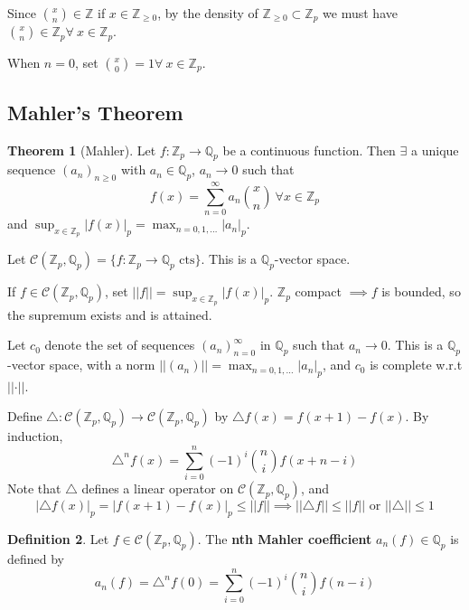 \documentclass[a4paper]{article}
\theoremstyle{definition}
\newtheorem{definition}{Definition}
\theoremstyle{default}
\newtheorem{theorem}[definition]{Theorem}
\theoremstyle{remark}
\newcommand*\abs[1]{\left|#1\right|}
\newcommand*\norm[1]{\abs{\abs{#1}}}
\begin{document}
Since ${x \choose n} \in \mathbb{Z}$ if $x \in \mathbb{Z}_{\geq 0}$,
by the density of $\mathbb{Z}_{\geq 0} \subset \mathbb{Z}_p$ we must have ${x \choose n} \in \mathbb{Z}_p \forall\ x \in \mathbb{Z}_p$.

When $n=0$,
set ${x \choose 0}=1 \forall\ x \in \mathbb{Z}_p$.

\subsection{Mahler's Theorem}
\begin{theorem}[Mahler]
	Let $f: \mathbb{Z}_p \to \mathbb{Q}_p$ be a continuous function.
	Then $\exists$ a unique sequence $(a_n)_{n\geq 0}$ with $a_n \in \mathbb{Q}_p$, $a_n \to 0$ such that
	$$f(x) = \sum_{n=0}^{\infty} a_n {x \choose n}\ \forall x \in \mathbb{Z}_p$$
	and $\sup_{x \in \mathbb{Z}_p}\abs{f(x)}_p = \max_{n=0,1,\dots}\abs{a_n}_p$.
\end{theorem}

Let $\mathcal{C}(\mathbb{Z}_p, \mathbb{Q}_p) = \{f: \mathbb{Z}_p \to \mathbb{Q}_p \text{ cts}\}$.
This is a $\mathbb{Q}_p$-vector space.

If $f \in \mathcal{C}(\mathbb{Z}_p, \mathbb{Q}_p)$, set $\norm{f} = \sup_{x \in \mathbb{Z}_p}\abs{f(x)}_p$.
$\mathbb{Z}_p$ compact $\implies f$ is bounded,
so the supremum exists and is attained.

Let $c_0$ denote the set of sequences $(a_n)_{n=0}^\infty$ in $\mathbb{Q}_p$ such that $a_n \to 0$.
This is a $\mathbb{Q}_p$-vector space, with a norm $\norm{(a_n)} = \max_{n=0,1,\dots}\abs{a_n}_p$,
and $c_0$ is complete w.r.t $\norm{\cdot}$.

Define $\triangle: \mathcal{C}(\mathbb{Z}_p, \mathbb{Q}_p) \to \mathcal{C}(\mathbb{Z}_p, \mathbb{Q}_p)$ by $\triangle f(x) = f(x+1) - f(x)$.
By induction,
$$\triangle^n f(x) = \sum_{i=0}^n (-1)^i {n \choose i} f(x+n-i)$$
Note that $\triangle$ defines a linear operator on $\mathcal{C}(\mathbb{Z}_p, \mathbb{Q}_p)$, and
$$\abs{\triangle f(x)}_p = \abs{f(x+1) - f(x)}_p \leq \norm{f} \implies \norm{\triangle f} \leq \norm{f} \text{ or } \norm{\triangle} \leq 1$$

\begin{definition}
	Let $f \in \mathcal{C}(\mathbb{Z}_p, \mathbb{Q}_p)$.
	The \textbf{nth Mahler coefficient} $a_n(f) \in \mathbb{Q}_p$ is defined by
	$$a_n(f) = \triangle^n f(0) = \sum_{i=0}^n (-1)^i {n \choose i} f(n-i)$$
\end{definition}
\end{document}
